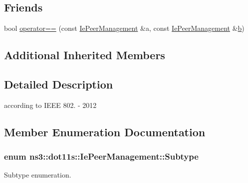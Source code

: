 \subsection*{Friends}
\begin{DoxyCompactItemize}
\item 
bool \hyperlink{classns3_1_1dot11s_1_1IePeerManagement_a9a5c46d6318512089fc0e428b43e9b6a}{operator==} (const \hyperlink{classns3_1_1dot11s_1_1IePeerManagement}{Ie\+Peer\+Management} \&a, const \hyperlink{classns3_1_1dot11s_1_1IePeerManagement}{Ie\+Peer\+Management} \&\hyperlink{lte__pathloss_8m_a21ad0bd836b90d08f4cf640b4c298e7c}{b})
\end{DoxyCompactItemize}
\subsection*{Additional Inherited Members}


\subsection{Detailed Description}
according to I\+E\+EE 802. -\/ 2012 

\subsection{Member Enumeration Documentation}
\subsubsection[{\texorpdfstring{Subtype}{Subtype}}]{\setlength{\rightskip}{0pt plus 5cm}enum {\bf ns3\+::dot11s\+::\+Ie\+Peer\+Management\+::\+Subtype}}\hypertarget{classns3_1_1dot11s_1_1IePeerManagement_aea0d743558aa7e6b37746e815be04b39}{}\label{classns3_1_1dot11s_1_1IePeerManagement_aea0d743558aa7e6b37746e815be04b39}


Subtype enumeration. 

